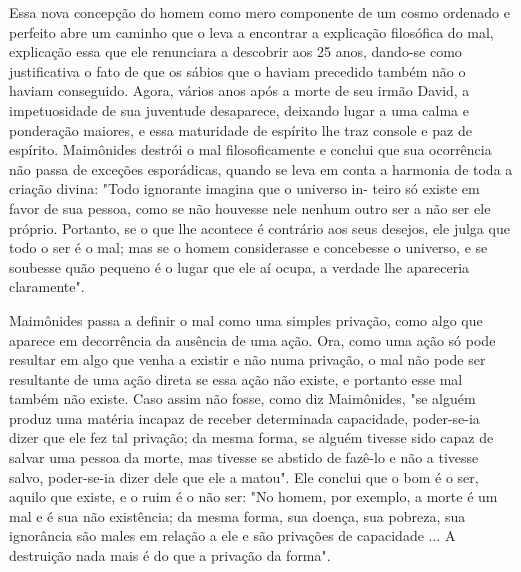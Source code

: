 \begin{itemize}
\begin{enumrate}
Essa nova concepção do homem como mero componente de um cosmo ordenado e
perfeito abre um caminho que o leva a encontrar a explica­ção filosófica
do mal, explicação essa que ele renunciara a descobrir aos 25 anos,
dando-se como justificativa o fato de que os sábios que o haviam
precedido também não o haviam conseguido. Agora, vários anos após a
morte de seu ir­mão David, a impetuosidade de sua juventude desaparece,
deixando lugar a uma calma e ponderação maiores, e essa maturidade de
espírito lhe traz console e paz de espírito. Maimônides destrói o mal
filosoficamente e conclui que sua ocorrência não passa de exceções
esporádicas, quando se leva em conta a har­monia de toda a criação
divina: "Todo ignorante imagina que o universo in-
teiro só existe em favor de sua pessoa, como se não houvesse nele nenhum
outro ser a não ser ele próprio. Portanto, se o que lhe acontece é
contrário aos seus desejos, ele julga que todo o ser é o mal; mas se o
homem considerasse e concebesse o universo, e se soubesse quão pequeno é
o lugar que ele aí ocu­pa, a verdade lhe apareceria claramente".

Maimônides passa a definir o mal como uma simples privação, co­mo algo
que aparece em decorrência da ausência de uma ação. Ora, como uma ação
só pode resultar em algo que venha a existir e não numa privação, o mal
não pode ser resultante de uma ação direta se essa ação não existe, e
portanto esse mal também não existe. Caso assim não fosse, como diz
Maimônides, "se alguém produz uma matéria incapaz de receber determinada
capacidade, poder-se-ia dizer que ele fez tal privação; da mesma forma,
se alguém tivesse sido ca­paz de salvar uma pessoa da morte, mas tivesse
se abstido de fazê-lo e não a tivesse salvo, poder-se-ia dizer dele que
ele a matou". Ele conclui que o bom é o ser, aquilo que existe, e o ruim
é o não ser: "No homem, por exemplo, a morte é um mal e é sua não
existência; da mesma forma, sua doença, sua po­breza, sua ignorância são
males em relação a ele e são privações de capacidade ... A destruição
nada mais é do que a privação da forma".


\end{enumrate}
\end{itemize}
